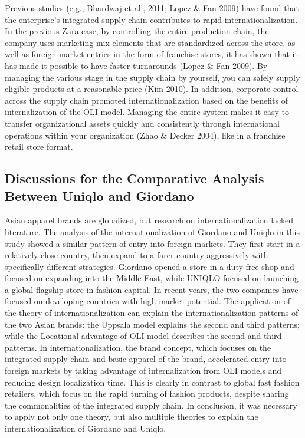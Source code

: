 \documentclass[12pt,a4paper]{article}
\begin{document}
Previous studies (e.g., Bhardwaj et al., 2011; Lopez \& Fan 2009) have
found that the enterprise's integrated supply chain contributes to rapid
internationalization. In the previous Zara case, by controlling the
entire production chain, the company uses marketing mix elements that
are standardized across the store, as well as foreign market entries in
the form of franchise stores, it has shown that it has made it possible
to have faster turnarounds (Lopez \& Fan 2009). By managing the various
stage in the supply chain by yourself, you can safely supply eligible
products at a reasonable price (Kim 2010). In addition, corporate
control across the supply chain promoted internationalization based on
the benefits of internalization of the OLI model. Managing the entire
system makes it easy to transfer organizational assets quickly and
consistently through international operations within your organization
(Zhao \& Decker 2004), like in a franchise retail store format.

\hypertarget{discussions-for-the-comparative-analysis-between-uniqlo-and-giordano}{%
\subsection{Discussions for the Comparative Analysis Between Uniqlo and
Giordano}\label{discussions-for-the-comparative-analysis-between-uniqlo-and-giordano}}

Asian apparel brands are globalized, but research on
internationalization lacked literature. The analysis of the
internationalization of Giordano and Uniqlo in this study showed a
similar pattern of entry into foreign markets. They first start in a
relatively close country, then expand to a farer country aggressively
with specifically different strategies. Giordano opened a store in a
duty-free shop and focused on expanding into the Middle East, while
UNIQLO focused on launching a global flagship store in fashion capital.
In recent years, the two companies have focused on developing countries
with high market potential. The application of the theory of
internationalization can explain the internationalization patterns of
the two Asian brands: the Uppsala model explains the second and third
patterns; while the Locational advantage of OLI model describes the
second and third patterns. In internationalization, the brand concept,
which focuses on the integrated supply chain and basic apparel of the
brand, accelerated entry into foreign markets by taking advantage of
internalization from OLI models and reducing design localization time.
This is clearly in contrast to global fast fashion retailers, which
focus on the rapid turning of fashion products, despite sharing the
commonalities of the integrated supply chain. In conclusion, it was
necessary to apply not only one theory, but also multiple theories to
explain the internationalization of Giordano and Uniqlo.
\end{document}

